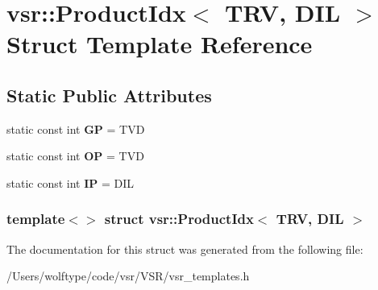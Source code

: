 \hypertarget{structvsr_1_1_product_idx_3_01_t_r_v_00_01_d_i_l_01_4}{\section{vsr\-:\-:Product\-Idx$<$ T\-R\-V, D\-I\-L $>$ Struct Template Reference}
\label{structvsr_1_1_product_idx_3_01_t_r_v_00_01_d_i_l_01_4}
}
\subsection*{Static Public Attributes}
\begin{DoxyCompactItemize}
\item 
\hypertarget{structvsr_1_1_product_idx_3_01_t_r_v_00_01_d_i_l_01_4_a6eb5dd48622162a77fad66762f0a2724}{static const int {\bfseries G\-P} = T\-V\-D}\label{structvsr_1_1_product_idx_3_01_t_r_v_00_01_d_i_l_01_4_a6eb5dd48622162a77fad66762f0a2724}

\item 
\hypertarget{structvsr_1_1_product_idx_3_01_t_r_v_00_01_d_i_l_01_4_a85a53dafcfca684b137d7f2a38b64f8d}{static const int {\bfseries O\-P} = T\-V\-D}\label{structvsr_1_1_product_idx_3_01_t_r_v_00_01_d_i_l_01_4_a85a53dafcfca684b137d7f2a38b64f8d}

\item 
\hypertarget{structvsr_1_1_product_idx_3_01_t_r_v_00_01_d_i_l_01_4_a3b97ac22f09455b0faeb09ac61b43e7a}{static const int {\bfseries I\-P} = D\-I\-L}\label{structvsr_1_1_product_idx_3_01_t_r_v_00_01_d_i_l_01_4_a3b97ac22f09455b0faeb09ac61b43e7a}

\end{DoxyCompactItemize}
\subsubsection*{template$<$$>$ struct vsr\-::\-Product\-Idx$<$ T\-R\-V, D\-I\-L $>$}



The documentation for this struct was generated from the following file\-:\begin{DoxyCompactItemize}
\item 
/\-Users/wolftype/code/vsr/\-V\-S\-R/vsr\-\_\-templates.\-h\end{DoxyCompactItemize}

